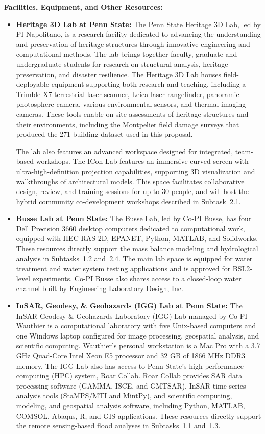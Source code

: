 \documentclass[11pt]{article}
\begin{document}
\pagestyle{empty}

\noindent \textbf{Facilities, Equipment, and Other Resources:}

\begin{itemize}

\item \textbf{Heritage 3D Lab at Penn State:}
The Penn State Heritage 3D Lab, led by PI Napolitano, is a research facility dedicated to advancing the understanding and preservation of heritage structures through innovative engineering and computational methods. The lab brings together faculty, graduate and undergraduate students for research on structural analysis, heritage preservation, and disaster resilience. The Heritage 3D Lab houses field-deployable equipment supporting both research and teaching, including a Trimble X7 terrestrial laser scanner, Leica laser rangefinder, panoramic photosphere camera, various environmental sensors, and thermal imaging cameras. These tools enable on-site assessments of heritage structures and their environments, including the Montpelier field damage surveys that produced the 271-building dataset used in this proposal.

The lab also features an advanced workspace designed for integrated, team-based workshops. The ICon Lab features an immersive curved screen with ultra-high-definition projection capabilities, supporting 3D visualization and walkthroughs of architectural models. This space facilitates collaborative design, review, and training sessions for up to 30 people, and will host the hybrid community co-development workshops described in Subtask~2.1.

\item \textbf{Busse Lab at Penn State:}
The Busse Lab, led by Co-PI Busse, has four Dell Precision 3660 desktop computers dedicated to computational work, equipped with HEC-RAS 2D, EPANET, Python, MATLAB, and Solidworks. These resources directly support the mass balance modeling and hydrological analysis in Subtasks~1.2 and~2.4. The main lab space is equipped for water treatment and water system testing applications and is approved for BSL2-level experiments. Co-PI Busse also shares access to a closed-loop water channel built by Engineering Laboratory Design, Inc.

\item \textbf{InSAR, Geodesy, \& Geohazards (IGG) Lab at Penn State:}
The InSAR Geodesy \& Geohazards Laboratory (IGG) Lab managed by Co-PI Wauthier is a computational laboratory with five Unix-based computers and one Windows laptop configured for image processing, geospatial analysis, and scientific computing. Wauthier's personal workstation is a Mac Pro with a 3.7 GHz Quad-Core Intel Xeon E5 processor and 32 GB of 1866 MHz DDR3 memory. The IGG Lab also has access to Penn State's high-performance computing (HPC) system, Roar Collab. Roar Collab provides SAR data processing software (GAMMA, ISCE, and GMTSAR), InSAR time-series analysis tools (StaMPS/MTI and MintPy), and scientific computing, modeling, and geospatial analysis software, including Python, MATLAB, COMSOL, Abaqus, R, and GIS applications. These resources directly support the remote sensing-based flood analyses in Subtasks~1.1 and~1.3.


\end{itemize}
\end{document}

